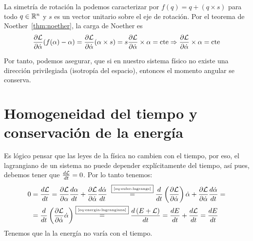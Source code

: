 La simetría de rotación la podemos caracterizar por $f(q)=q+(q\times s)$ para todo $q\in\mathbb{R}^n$ y $s$ es un vector unitario sobre el eje de rotación.
Por el teorema de Noether~\eqref{thm:noether}, la carga de Noether es
\begin{equation}
	\label{eq:conservacion_momento_angular}
	\frac{\partial \mathcal{L}}{\partial\dot{\alpha}}(f(\alpha)-\alpha) = \frac{\partial \mathcal{L}}{\partial\dot{\alpha}}(\alpha\times s) = s \frac{\partial \mathcal{L}}{\partial\dot{\alpha}}\times \alpha=\text{cte}\Rightarrow\frac{\partial \mathcal{L}}{\partial\dot{\alpha}}\times \alpha=\text{cte}
\end{equation}

Por tanto, podemos asegurar, que si en nuestro sistema físico no existe una dirección privilegiada (isotropía del espacio), entonces el momento angular se conserva.

\section{Homogeneidad del tiempo y conservación de la energía}\label{sec:homogeneidad-del-tiempo-y-conservacion-de-la-energia}



Es lógico pensar que las leyes de la física no cambien con el tiempo, por eso, el lagrangiano de un sistema no puede depender explícitamente del tiempo, así pues, debemos tener que $\frac{d\mathcal{L}}{dt}=0$.
Por lo tanto tenemos:
\begin{align*}
	0 & = \frac{d\mathcal{L}}{dt}=\frac{\partial \mathcal{L}}{\partial \alpha}\frac{d\alpha}{dt}+\frac{\partial \mathcal{L}}{\partial \dot{\alpha}}\frac{d\dot{\alpha}}{dt} ~\overset{\fbox{\tiny \ref{eq:euler-lagrange}}}{=} \frac{d}{dt}\left(\frac{\partial \mathcal{L}}{\partial \dot{\alpha}}\right)\dot{\alpha}+\frac{\partial \mathcal{L}}{\partial \dot{\alpha}}\frac{d\dot{\alpha}}{dt}=\\
	& = \frac{d}{dt}\left(\frac{\partial \mathcal{L}}{\partial \dot{\alpha}}\dot{\alpha}\right)\overset{\fbox{\tiny \ref{eq:energia-lagrangiana}}}{=}\frac{d\left(E+\mathcal{L}\right)}{dt}=\frac{d E}{dt}+\frac{d\mathcal{L}}{dt}=\frac{d E}{dt}
\end{align*}
Tenemos que la la energía no varía con el tiempo.
